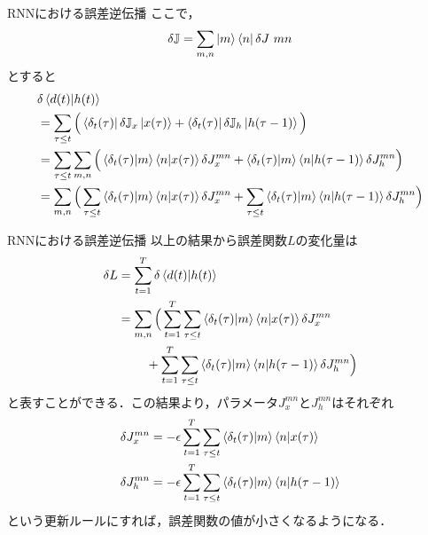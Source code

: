 \documentclass[dvipdfmx,10pt]{beamer}
\begin{document}
  \begin{frame}{RNNにおける誤差逆伝播}
    ここで，
    \begin{equation*}
      \delta \mathbb{J} = \sum_{m,n} \ket{m}\bra{n}\delta J~{mn}
    \end{equation*}
    とすると
    \begin{align*}
      &\delta \braket{d(t)|h(t)} \\
      &= \sum_{\tau \leq t} \Big(\bra{\delta_t (\tau)}\delta \mathbb{J}_x \ket{x(\tau)} + \bra{\delta_t (\tau)}\delta \mathbb{J}_h \ket{h(\tau-1)} \Big)\\
      &= \sum_{\tau \leq t} \sum_{m,n} \Big( \braket{\delta_t (\tau)|m} \braket{n|x(\tau)}\delta J_x^{mn} + \braket{\delta_t (\tau)|m} \braket{n|h(\tau-1)}\delta J_h^{mn} \Big)\\
      &= \sum_{m,n} \Big( \sum_{\tau \leq t} \braket{\delta_t (\tau)|m} \braket{n|x(\tau)}\delta J_x^{mn} + \sum_{\tau \leq t} \braket{\delta_t (\tau)|m} \braket{n|h(\tau-1)}\delta J_h^{mn} \Big)
    \end{align*}
  \end{frame}

  \begin{frame}{RNNにおける誤差逆伝播}
    以上の結果から誤差関数$L$の変化量は
    \begin{align*}
      \delta L 
      &= \sum_{t=1}^{T}\delta\braket{d(t)|h(t)}\\
      &= \sum_{m,n} \Big( \sum_{t=1}^{T}\sum_{\tau \leq t} \braket{\delta_t (\tau)|m} \braket{n|x(\tau)}\delta J_x^{mn}\\
      &\hspace{0.8cm}+ \sum_{t=1}^{T}\sum_{\tau \leq t} \braket{\delta_t (\tau)|m} \braket{n|h(\tau-1)}\delta J_h^{mn} \Big)
    \end{align*}
    と表すことができる．この結果より，パラメータ$J_x^{mn}$と$J_h^{mn}$はそれぞれ
    \begin{align*}
      \delta J_x^{mn} &= -\epsilon \sum_{t=1}^{T}\sum_{\tau \leq t} \braket{\delta_t (\tau)|m} \braket{n|x(\tau)}\\
      \delta J_h^{mn} &= -\epsilon \sum_{t=1}^{T}\sum_{\tau \leq t} \braket{\delta_t (\tau)|m} \braket{n|h(\tau-1)}
    \end{align*}
    という更新ルールにすれば，誤差関数の値が小さくなるようになる．
  \end{frame}
\end{document}
